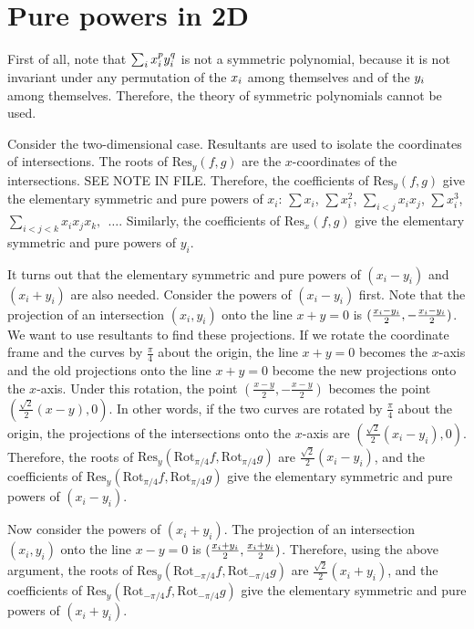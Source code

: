\section{Pure powers in 2D}

First of all, note that $\sum_{i} x_{i}^{p} y_{i}^{q}$ is not a symmetric polynomial,
because it is not invariant under any permutation of the $x_{i}$ among themselves
and of the $y_{i}$ among themselves.
Therefore, the theory of symmetric polynomials cannot be used.

Consider the two-dimensional case.
Resultants are used to isolate the coordinates of intersections.
The roots of $\mbox{Res}_{y}(f,g)$ are the $x$-coordinates of the intersections.
SEE NOTE IN FILE.
Therefore, the coefficients of $\mbox{Res}_{y}(f,g)$ give the elementary symmetric 
and pure powers of $x_{i}$: 
$\sum x_{i}$,
$\sum x_{i}^{2}$,
$\sum_{i < j} x_{i}x_{j}$,
$\sum x_{i}^{3}$,
$\sum_{i < j < k} x_{i}x_{j}x_{k},\ \ \ldots$.
Similarly, the coefficients of $\mbox{Res}_{x}(f,g)$ give the elementary symmetric and pure
powers of $y_{i}$.

It turns out that the elementary symmetric and pure powers of $(x_{i} - y_{i})$ and
$(x_{i} + y_{i})$ are also needed.
Consider the powers of $(x_{i} - y_{i})$ first.
Note that the projection of an intersection $(x_{i},y_{i})$ 
onto the line $x + y = 0$ is $(\frac{x_{i}-y_{i}}{2},-\frac{x_{i}-y_{i}}{2})$.
We want to use resultants to find these projections.
If we rotate the coordinate frame and the curves by $\frac{\pi}{4}$ about the origin, 
the line $x + y = 0$ becomes the $x$-axis
and the old projections onto the line $x+y=0$ become the new projections onto the $x$-axis.
Under this rotation, the point $(\frac{x-y}{2},-\frac{x-y}{2})$ becomes the point 
$(\frac{\sqrt{2}}{2}(x-y),0)$.
In other words, if the two curves are rotated by $\frac{\pi}{4}$ about the origin,
the projections of the intersections onto the $x$-axis are 
$(\frac{\sqrt{2}}{2}(x_{i}-y_{i}),0)$.
Therefore, the roots of $\mbox{Res}_{y}(\mbox{Rot}_{\pi/4}f,\mbox{Rot}_{\pi/4}g)$
are $\frac{\sqrt{2}}{2}(x_{i}-y_{i})$, and the coefficients of 
$\mbox{Res}_{y}(\mbox{Rot}_{\pi/4}f,\mbox{Rot}_{\pi/4}g)$ 
give the elementary symmetric and pure powers of $(x_{i}-y_{i})$.

Now consider the powers of $(x_{i} + y_{i})$.
The projection of an intersection $(x_{i},y_{i})$ 
onto the line $x - y = 0$ is $(\frac{x_{i}+y_{i}}{2},\frac{x_{i}+y_{i}}{2})$.
Therefore, using the above argument, 
the roots of $\mbox{Res}_{y}(\mbox{Rot}_{-\pi/4}f,\mbox{Rot}_{-\pi/4}g)$
are $\frac{\sqrt{2}}{2}(x_{i}+y_{i})$, and the coefficients of 
$\mbox{Res}_{y}(\mbox{Rot}_{-\pi/4}f,\mbox{Rot}_{-\pi/4}g)$ 
give the elementary symmetric and pure powers of $(x_{i}+y_{i})$.

